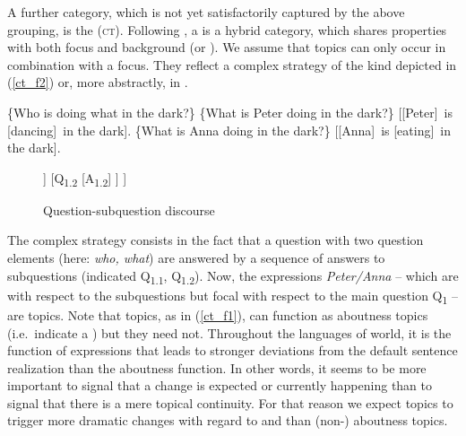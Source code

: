 \documentclass[output=paper,
,modfonts
,nonflat]{langsci/langscibook}
\begin{document}
A further category, which is not yet satisfactorily captured by the above grouping, is the  \textsc{(ct)}. Following \cite{bueda03}, a  is a hybrid category, which shares properties with both focus and background (or ). We assume that  topics can only occur in combination with a focus. They reflect a complex  strategy of the kind depicted in (\ref{ct_f2}) or, more abstractly, in .

\newpage 
\begin{exe}
\ex\label{ct_f2}
\begin{xlist}
 \{Who is doing what in the dark?\}
  \{What is Peter doing in the dark?\}
 {[[Peter]\ctopic\ is [dancing]\focus\ in the dark]\sq}.
 \{What is Anna doing in the dark?\}
 {[[Anna]\ctopic\ is [eating]\focus\ in the dark]\sq}.
\end{xlist}
\end{exe}

\begin{figure}
\begin{forest} %
[{Q\textsubscript{1}}
    [{Q\textsubscript{{1.1}}}
      [{A\textsubscript{{1.1}}}]
    ]
    [{Q\textsubscript{{1.2}}}
      [{A\textsubscript{{1.2}}}]
    ]
  ] 
\end{forest} 
\caption{Question-subquestion discourse}
\label{fig:ct_simple1}
\end{figure}

\noindent The complex strategy consists in the fact that a question with two question elements (here: \textit{who, what}) are answered by a sequence of answers to subquestions (indicated Q\textsubscript{{1.1}}, Q\textsubscript{{1.2}}). Now, the expressions \textit{Peter/Anna} -- which are  with respect to the subquestions but focal with respect to the main question Q\textsubscript{1} -- are  topics. Note that  topics, as in (\ref{ct_f1}), can function as aboutness topics (i.e.\ indicate a  ) but they need not. Throughout the languages of world, it is the  function of expressions that leads to stronger deviations from the default sentence realization than the aboutness function. In other words, it seems to be more important to signal that a change is expected or currently happening than to signal that there is a mere topical continuity. For that reason we expect  topics to trigger more dramatic changes with regard to  and  than (non-) aboutness topics.
\end{document}
